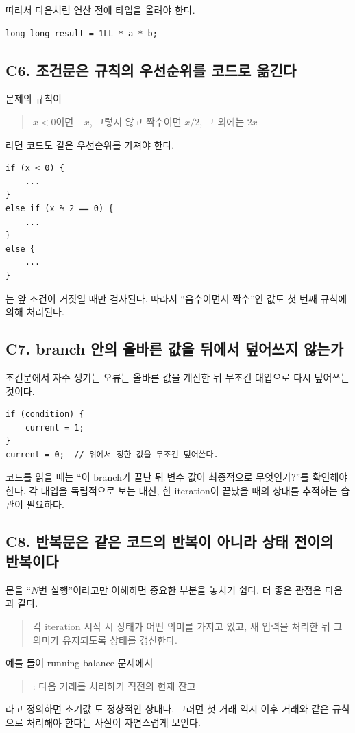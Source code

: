따라서 다음처럼 연산 전에 타입을 올려야 한다.
\begin{lstlisting}
long long result = 1LL * a * b;
\end{lstlisting}

\subsection{C6. 조건문은 규칙의 우선순위를 코드로 옮긴다}
문제의 규칙이
\begin{quote}
$x<0$이면 $-x$, 그렇지 않고 짝수이면 $x/2$, 그 외에는 $2x$
\end{quote}
라면 코드도 같은 우선순위를 가져야 한다.
\begin{lstlisting}
if (x < 0) {
    ...
}
else if (x % 2 == 0) {
    ...
}
else {
    ...
}
\end{lstlisting}

는 앞 조건이 거짓일 때만 검사된다. 따라서 ``음수이면서 짝수''인 값도 첫 번째 규칙에 의해 처리된다.

\subsection{C7. branch 안의 올바른 값을 뒤에서 덮어쓰지 않는가}
조건문에서 자주 생기는 오류는 올바른 값을 계산한 뒤 무조건 대입으로 다시 덮어쓰는 것이다.
\begin{lstlisting}
if (condition) {
    current = 1;
}
current = 0;  // 위에서 정한 값을 무조건 덮어쓴다.
\end{lstlisting}

코드를 읽을 때는 ``이 branch가 끝난 뒤 변수 값이 최종적으로 무엇인가?''를 확인해야 한다. 각 대입을 독립적으로 보는 대신, 한 iteration이 끝났을 때의 상태를 추적하는 습관이 필요하다.

\subsection{C8. 반복문은 같은 코드의 반복이 아니라 상태 전이의 반복이다}
문을 ``$N$번 실행''이라고만 이해하면 중요한 부분을 놓치기 쉽다. 더 좋은 관점은 다음과 같다.

\begin{quote}
각 iteration 시작 시 상태가 어떤 의미를 가지고 있고, 새 입력을 처리한 뒤 그 의미가 유지되도록 상태를 갱신한다.
\end{quote}

예를 들어 running balance 문제에서
\begin{quote}
: 다음 거래를 처리하기 직전의 현재 잔고
\end{quote}
라고 정의하면 초기값 도 정상적인 상태다. 그러면 첫 거래 역시 이후 거래와 같은 규칙으로 처리해야 한다는 사실이 자연스럽게 보인다.

